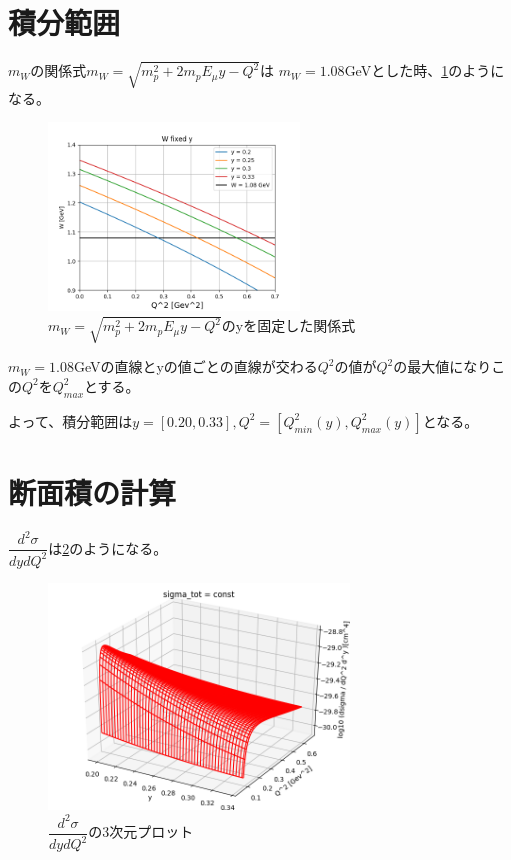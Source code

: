 \section{積分範囲}
$m_W$の関係式$m_W = \sqrt{m_p^2 + 2m_pE_\mu y - Q^2}$は
$m_W = 1.08$GeVとした時、\ref{fig:sigma5}のようになる。

\begin{figure}[H]
    \centering
    \includegraphics[height=5cm]{img/W2_fixed_y.png}
    \caption{$m_W = \sqrt{m_p^2 + 2m_pE_\mu y - Q^2}$のyを固定した関係式}
    \label{fig:sigma5}
\end{figure}

$m_W = 1.08$GeVの直線とyの値ごとの直線が交わる$Q^2$の値が$Q^2$の最大値になりこの$Q^2$を$Q^2_{max}$とする。

よって、積分範囲は$y = [0.20, 0.33], Q^2 = [Q^2_{min}(y), Q^2_{max}(y)]$となる。

\section{断面積の計算}
$\dfrac{d^2\sigma}{dydQ^2}$は\ref{fig:sigma6}のようになる。

\begin{figure}[H]
    \centering
    \includegraphics[width=8cm]{img/integrate_flux_used_artile.png}
    \caption{$\dfrac{d^2\sigma}{dydQ^2}$の3次元プロット}
    \label{fig:sigma6}
\end{figure}

